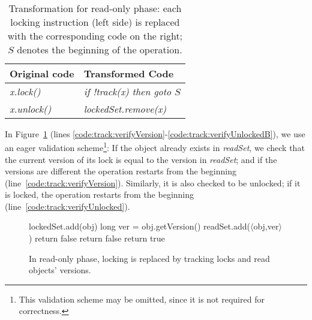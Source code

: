 \begin{table}
\codesize
\ttfamily
{\tt
\begin{center}
\begin{tabular}{|l|l|}
\hline
\textbf{Original code} & \textbf{Transformed Code}\\
\hline
\textit{x.lock()}&
\textit{if !track(x) then goto $S$}
\\
\hline
\textit{x.unlock()}&
\textit{lockedSet.remove(x)}
\\
\hline
\end{tabular}
\end{center}
}
\caption{Transformation for read-only phase:
each locking instruction (left side) is replaced with the corresponding code on the right;
 $S$  denotes the beginning of the operation.
}
\label{Ta:readOnlyTransformation}
\end{table}

In Figure~\ref{figure::track} (lines \ref{code:track:verifyVersion}-\ref{code:track:verifyUnlockedB}), we use an eager validation scheme\footnote{This validation scheme may be omitted, since it is not required for correctness.}: 
If the object already exists in \emph{readSet}, we check that the current version of its lock is equal
to the version in \emph{readSet}; and if the versions are different  the operation restarts from the beginning (line~\ref{code:track:verifyVersion}).
Similarly, it is also checked to be unlocked; if it is locked, the operation restarts from the beginning (line~\ref{code:track:verifyUnlocked}).



\begin{figure}
\codesize
\begin{algorithmic}[1]{}
		{\ttfamily
		\State{}lockedSet.add(obj) \label{code:lockedSet:add}
			\State long ver = obj.getVersion() \label{code:track:getVersion}
			\State readSet.add($\langle$obj,ver$\rangle$)
			 \label{code:track:verifyVersion}
				\State return false
			\EndIf
			 \label{code:track:verifyUnlocked}
				\State return false \label{code:track:verifyUnlockedB}
			\EndIf
			\State return true
		\EndFunction
		}
\end{algorithmic}
\caption{In read-only phase, locking is replaced by
tracking locks and read
objects' versions.
\label{figure::track}}
\end{figure}

